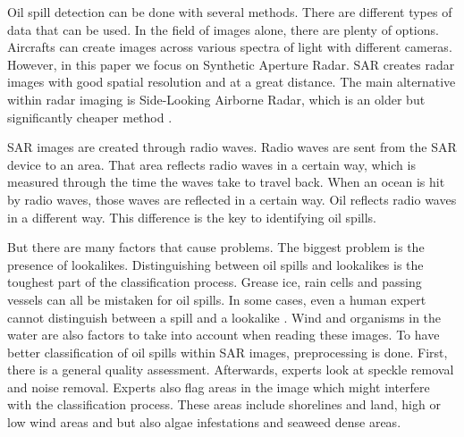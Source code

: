 \hspace{0.5cm} Oil spill detection can be done with several methods. There are different types of data that can be used. In the field of images alone, there are plenty of options. Aircrafts can create images across various spectra of light with different cameras. However, in this paper we focus on Synthetic Aperture Radar. SAR creates radar images with good spatial resolution and at a great distance. The main alternative within radar imaging is Side-Looking Airborne Radar, which is an older but significantly cheaper method \cite{fingas2014review}. 

SAR images are created through radio waves. Radio waves are sent from the SAR device to an area. That area reflects radio waves in a certain way, which is measured through the time the waves take to travel back. \cite{Doerry:04} When an ocean is hit by radio waves, those waves are reflected in a certain way. Oil reflects radio waves in a different way. This difference is the key to identifying oil spills.

But there are many factors that cause problems. The biggest problem is the presence of lookalikes. Distinguishing between oil spills and lookalikes is the toughest part of the classification process. Grease ice, rain cells and passing vessels can all be mistaken for oil spills\cite{Brekke200595}. In some cases, even a human expert cannot distinguish between a spill and a lookalike \cite{Keramitsoglou2006640}. Wind and organisms in the water are also factors to take into account when reading these images. To have better classification of oil spills within SAR images, preprocessing is done. First, there is a general quality assessment. Afterwards, experts look at speckle removal and noise removal. Experts also flag areas in the image which might interfere with the classification process. These areas include shorelines and land, high or low wind areas and but also algae infestations and seaweed dense areas\cite{fingas2014review}.



